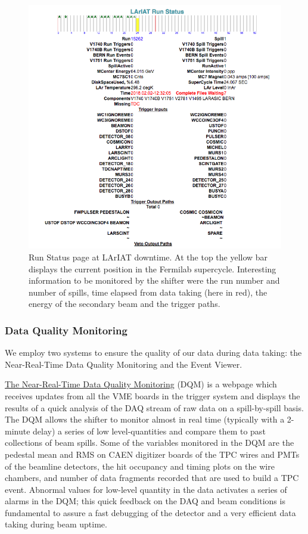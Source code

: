 \begin{figure}[htb]
\centering
\includegraphics[scale=0.6]{Chapter-3/Images/RunConditions.png}
\caption{Run Status page at LArIAT downtime. At the top the yellow bar displays the current position in the Fermilab supercycle. Interesting information to be monitored by the shifter were the run number and number of spills, time elapsed from data taking (here in red), the energy of the secondary beam and the trigger paths.}
\label{fig:runcond}
\end{figure}



\subsubsection{Data Quality Monitoring}
We employ two systems to ensure the quality of our data during data taking: the Near-Real-Time Data Quality Monitoring and the Event Viewer.

\href{http://lariat-daq01.fnal.gov:5000/}{The Near-Real-Time Data Quality Monitoring} (DQM) is a  webpage which receives updates from all the VME boards in the trigger system and displays the results of a quick analysis of the DAQ stream of raw data on a spill-by-spill basis. The DQM allows the shifter to monitor almost in real time (typically with a 2-minute delay)  a series of low level-quantities and compare them to past collections of beam spills. Some of the variables monitored in the DQM are  the pedestal mean and RMS on CAEN digitizer boards
of the TPC wires and PMTs of the beamline detectors, the hit occupancy and timing plots on the wire chambers, and number of data fragments recorded that are used to build a TPC event. Abnormal values for  low-level quantity in the data  activates a series of alarms in the DQM; this quick feedback on the DAQ and beam conditions is fundamental to assure a fast debugging of the detector and a very efficient data taking during beam uptime.

